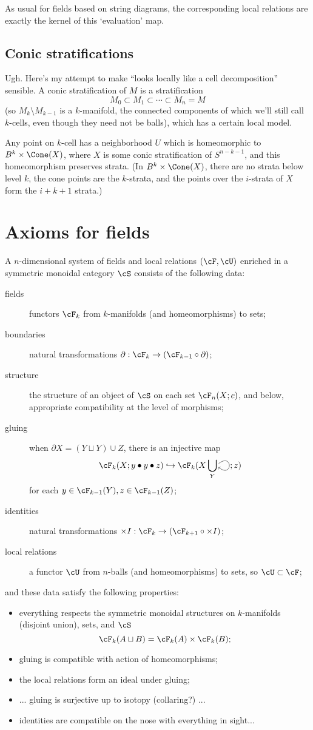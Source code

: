 \documentclass[11pt]{amsart}
\theoremstyle{plain}
\newcommand{\selfarrow}{\ensuremath{\smash{\tikz[baseline]{\clip (0,0.36) rectangle (0.48,-0.16); \draw[->] (0,0.175) .. controls (0.6,0.65) and (0.6,-0.45) .. (0,0.025);}}}}
\newcommand{\bdy}{\partial}
\newcommand{\into}{\hookrightarrow}
\begin{document}
As usual for fields based on string diagrams, the corresponding local relations are exactly the kernel of this `evaluation' map.

\subsection{Conic stratifications}
Ugh. Here's my attempt to make ``looks locally like a cell decomposition'' sensible. A conic stratification of $M$ is a stratification $$M_0 \subset M_1 \subset \cdots \subset M_n = M$$
(so $M_k \setminus M_{k-1}$ is a $k$-manifold, the connected components of which we'll still call $k$-cells, even though they need not be balls), which has a certain local model.

Any point on $k$-cell has a neighborhood $U$ which is homeomorphic to $B^k \times \Cone(X)$, where $X$ is some conic stratification of $S^{n-k-1}$, and this homeomorphism preserves strata. (In $B^k \times \Cone(X)$, there are no strata below level $k$, the cone points are the $k$-strata, and the points over the $i$-strata of $X$ form the $i+k+1$ strata.)

\section{Axioms for fields}
A $n$-dimensional system of fields and local relations $(\cF, \cU)$ enriched in a symmetric monoidal category $\cS$ consists of the following data:
\begin{description}
\item[fields] functors $\cF_k$ from $k$-manifolds (and homeomorphisms) to sets;
\item[boundaries] natural transformations $\bdy : \cF_k \to (\cF_{k-1} \circ \bdy)$;
\item[structure] the structure of an object of $\cS$ on each set $\cF_n(X; c)$, and below, appropriate compatibility at the level of morphisms;
\item[gluing] when $\bdy X = (Y \sqcup Y) \cup Z$, there is an injective map $$\cF_k(X; y \bullet y \bullet z) \into \cF_k(X \bigcup_Y \selfarrow; z)$$ for each $y \in \cF_{k-1}(Y), z \in \cF_{k-1}(Z)$;
\item[identities] natural transformations $\times I: \cF_k \to (\cF_{k+1} \circ \times I)$;
\item[local relations] a functor $\cU$ from $n$-balls (and homeomorphisms) to sets, so $\cU \subset \cF$;
\end{description}
and these data satisfy the following properties:
\begin{itemize}
\item everything respects the symmetric monoidal structures on $k$-manifolds (disjoint union), sets, and $\cS$ $$\cF_k(A \sqcup B) = \cF_k(A) \times \cF_k(B);$$
\item gluing is compatible with action of homeomorphisms;
\item the local relations form an ideal under gluing;
\item ... gluing is surjective up to isotopy (collaring?) ...
\item identities are compatible on the nose with everything in sight...
\end{itemize}
\end{document}

